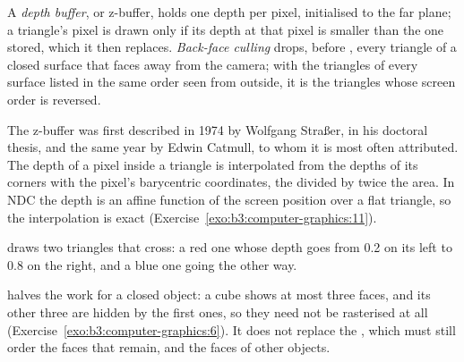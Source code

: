 \begin{definition}\label{def:b3:computer-graphics:visibility}
A \emph{depth buffer}, or z-buffer, holds one depth per pixel, initialised to the far plane; a triangle's pixel is drawn only if its depth at that pixel is smaller than the one stored, which it then replaces. \emph{Back-face culling} drops, before , every triangle of a closed surface that faces away from the camera; with the triangles of every surface listed in the same order seen from outside, it is the triangles whose screen order is reversed.
\end{definition}

The z-buffer was first described in 1974 by Wolfgang Stra\ss er, in his doctoral thesis, and the same year by Edwin Catmull, to whom it is most often attributed. %
The depth of a pixel inside a triangle is interpolated from the depths of its corners with the pixel's barycentric coordinates, the  divided by twice the area. In NDC the depth is an affine function of the screen position over a flat triangle, so the interpolation is exact (Exercise~\ref{exo:b3:computer-graphics:11}).

\label{lst:b3:computer-graphics:zbuffer}

 draws two triangles that cross: a red one whose depth goes from 0.2 on its left to 0.8 on the right, and a blue one going the other way.

\label{out:b3:computer-graphics:zbuffer}


 halves the work for a closed object: a cube shows at most three faces, and its other three are hidden by the first ones, so they need not be rasterised at all (Exercise~\ref{exo:b3:computer-graphics:6}). It does not replace the , which must still order the faces that remain, and the faces of other objects.

